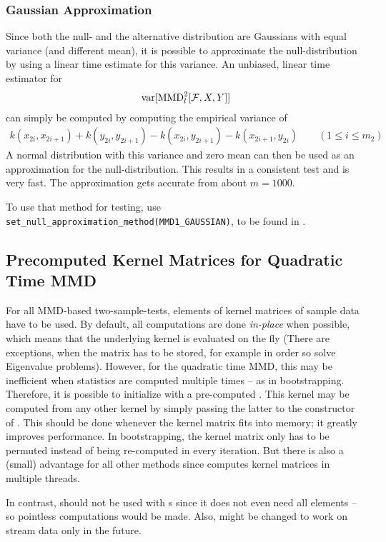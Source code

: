 \subsubsection{Gaussian Approximation}
Since both the null- and the alternative distribution are Gaussians with equal variance (and different mean), it is possible to approximate the null-distribution by using a linear time estimate for this variance. An unbiased, linear time estimator for
\begin{align*}
\operatorname{var}[\operatorname{MMD}_l^2[\mathcal{F},X,Y]]
\end{align*}
can simply be computed by computing the empirical variance of
\begin{align*}
k(x_{2i},x_{2i+1})+k(y_{2i},y_{2i+1})-k(x_{2i},y_{2i+1})-k(x_{2i+1},y_{2i}) \qquad (1\leq i\leq m_2)
\end{align*}
A normal distribution with this variance and zero mean can then be used as an approximation for the null-distribution. This results in a consistent test and is very fast. The approximation gets accurate from about $m=1000$.

To use that method for testing, use \texttt{set\_null\_approximation\_method(MMD1\_GAUSSIAN)}, to be found in .

\subsection{Precomputed Kernel Matrices for Quadratic Time MMD}
\label{sec:quadratic_mmd_precomputed_kernel}
For all MMD-based two-sample-tests, elements of kernel matrices of sample data have to be used. By default, all computations are done \emph{in-place} when possible, which means that the underlying kernel is evaluated on the fly (There are exceptions, when the matrix has to be stored, for example in order so solve Eigenvalue problems). However, for the quadratic time MMD, this may be inefficient when statistics are computed multiple times -- as in bootstrapping. Therefore, it is possible to initialize  with a pre-computed . This kernel may be computed from any other kernel by simply passing the latter to the constructor of . This should be done whenever the kernel matrix fits into memory; it greatly improves performance. In bootstrapping, the kernel matrix only has to be permuted instead of being re-computed in every iteration. But there is also a (small) advantage for all other methods since \shogun{} computes kernel matrices in multiple threads.

In contrast,  should not be used with s since it does not even need all elements -- so pointless computations would be made. Also,  might be changed to work on stream data only in the future.
